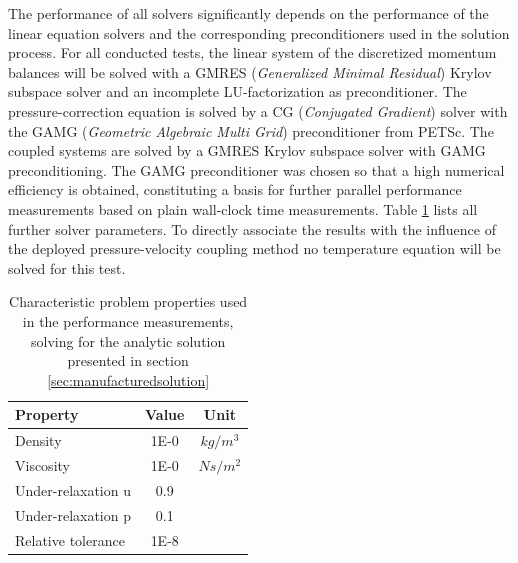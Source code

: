The performance of all solvers significantly depends on the performance of the linear equation solvers and the corresponding preconditioners used in the solution process. For all conducted tests, the linear system of the discretized momentum balances will be solved with a GMRES (\emph{Generalized Minimal Residual}) \cite{saad86} Krylov subspace solver and an incomplete LU-factorization as preconditioner. The pressure-correction equation is solved by a CG (\emph{Conjugated Gradient}) solver \cite{hestenes52} with the GAMG (\emph{Geometric Algebraic Multi Grid}) preconditioner from PETSc. The coupled systems are solved by a GMRES Krylov subspace solver with GAMG preconditioning. The GAMG preconditioner was chosen so that a high numerical efficiency is obtained, constituting a basis for further parallel performance measurements based on plain wall-clock time measurements. Table \ref{tab:performance} lists all further solver parameters. To directly associate the results with the influence of the deployed pressure-velocity coupling method no temperature equation will be solved for this test.

\begin{table}[h!]\centering
  \caption{Characteristic problem properties used in the performance measurements, solving for the analytic solution presented in section \ref{sec:manufacturedsolution}}
  \begin{tabular}{lcc}\toprule
    Property & Value & Unit \\
    \midrule
    \rowcolor{tud0a} Density    & 1E-0 & $kg/m^3$      \\
    \rowcolor{black!00} Viscosity  & 1E-0 & $Ns/m^2$  \\
    \rowcolor{tud0a} Under-relaxation u & 0.9 &  \\
    \rowcolor{black!00} Under-relaxation p & 0.1 &  \\
    \rowcolor{tud0a} Relative tolerance & 1E-8&
  \end{tabular}
  \label{tab:performance}
\end{table}
 
